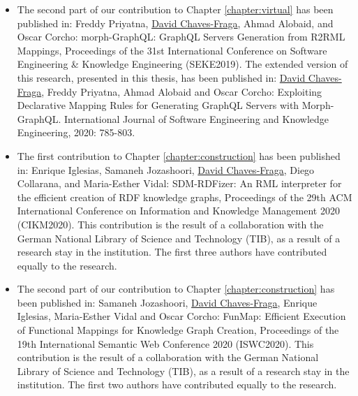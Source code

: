 \begin{itemize}
    \item The second part of our contribution to Chapter \ref{chapter:virtual} has been published in:  Freddy Priyatna, \underline{David Chaves-Fraga}, Ahmad Alobaid, and Oscar Corcho: morph-GraphQL: GraphQL Servers Generation from R2RML Mappings, Proceedings of the 31st International Conference on Software Engineering \& Knowledge Engineering (SEKE2019). The extended version of this research, presented in this thesis, has been published in: \underline{David Chaves-Fraga}, Freddy Priyatna, Ahmad Alobaid and Oscar Corcho: Exploiting Declarative Mapping Rules for Generating GraphQL Servers with Morph-GraphQL. International Journal of Software Engineering and Knowledge Engineering, 2020: 785-803.
    \item The first contribution to Chapter \ref{chapter:construction} has been published in: Enrique Iglesias, Samaneh Jozashoori, \underline{David Chaves-Fraga}, Diego Collarana, and Maria-Esther Vidal: SDM-RDFizer: An RML interpreter for the efficient creation of RDF knowledge graphs, Proceedings of the 29th ACM International Conference on Information and Knowledge Management 2020 (CIKM2020). This contribution is the result of a collaboration with the German National Library of Science and Technology (TIB), as a result of a research stay in the institution. The first three authors have contributed equally to the research.
    \item The second part of our contribution to Chapter \ref{chapter:construction} has been published in: Samaneh Jozashoori, \underline{David Chaves-Fraga}, Enrique Iglesias, Maria-Esther Vidal and Oscar Corcho: FunMap: Efficient Execution of Functional Mappings for Knowledge Graph Creation, Proceedings of the 19th International Semantic Web Conference 2020 (ISWC2020). This contribution is the result of a collaboration with the German National Library of Science and Technology (TIB), as a result of a research stay in the institution. The first two authors have contributed equally to the research.
    
\end{itemize}



